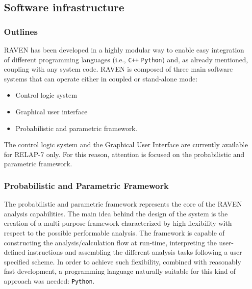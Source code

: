 \subsection{Software infrastructure}
\subsubsection{Outlines}
RAVEN has been developed in a highly modular way to enable easy integration of different programming languages (i.e., \texttt{C++} \texttt{Python}) and, as already mentioned, coupling with any system code.  
RAVEN is composed of three main software systems that can operate either in coupled or stand-alone mode:
\begin{itemize}
  \item Control logic system
  \item Graphical user interface
  \item Probabilistic and parametric framework.
\end{itemize}
The control logic system and the Graphical User Interface are currently available for RELAP-7 only. For this reason, attention is focused on the probabilistic and parametric framework.

\subsubsection{Probabilistic and Parametric Framework}
The probabilistic and parametric framework represents the core of the RAVEN analysis capabilities. The main idea behind the design of the system is the creation of a multi-purpose framework characterized by high flexibility with respect to the possible performable analysis. The framework is capable of constructing the analysis/calculation flow at run-time, interpreting the user-defined instructions and assembling the different analysis tasks following a user specified scheme. 
In order to achieve such flexibility, combined with reasonably fast development, a programming language naturally suitable for this kind of approach was needed: \texttt{Python}.  

